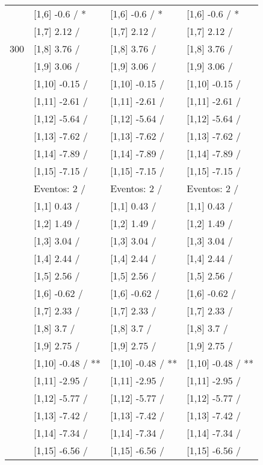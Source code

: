 \begin{table}
\begin{tabular}[t]{llll}
 & {}[1,6] -0.6  / * & {}[1,6] -0.6  / * & {}[1,6] -0.6  / *\\
 & {}[1,7] 2.12  / & {}[1,7] 2.12  / & {}[1,7] 2.12  /\\
300 & {}[1,8] 3.76  / & {}[1,8] 3.76  / & {}[1,8] 3.76  /\\
\addlinespace
 & {}[1,9] 3.06  / & {}[1,9] 3.06  / & {}[1,9] 3.06  /\\
 & {}[1,10] -0.15  / & {}[1,10] -0.15  / & {}[1,10] -0.15  /\\
 & {}[1,11] -2.61  / & {}[1,11] -2.61  / & {}[1,11] -2.61  /\\
 & {}[1,12] -5.64  / & {}[1,12] -5.64  / & {}[1,12] -5.64  /\\
 & {}[1,13] -7.62  / & {}[1,13] -7.62  / & {}[1,13] -7.62  /\\
\addlinespace
 & {}[1,14] -7.89  / & {}[1,14] -7.89  / & {}[1,14] -7.89  /\\
 & {}[1,15] -7.15  / & {}[1,15] -7.15  / & {}[1,15] -7.15  /\\
 & Eventos:  2 / & Eventos:  2 / & Eventos:  2 /\\
 & {}[1,1] 0.43  / & {}[1,1] 0.43  / & {}[1,1] 0.43  /\\
 & {}[1,2] 1.49  / & {}[1,2] 1.49  / & {}[1,2] 1.49  /\\
\addlinespace
 & {}[1,3] 3.04  / & {}[1,3] 3.04  / & {}[1,3] 3.04  /\\
 & {}[1,4] 2.44  / & {}[1,4] 2.44  / & {}[1,4] 2.44  /\\
 & {}[1,5] 2.56  / & {}[1,5] 2.56  / & {}[1,5] 2.56  /\\
 & {}[1,6] -0.62  / & {}[1,6] -0.62  / & {}[1,6] -0.62  /\\
 & {}[1,7] 2.33  / & {}[1,7] 2.33  / & {}[1,7] 2.33  /\\
\addlinespace
500 & {}[1,8] 3.7  / & {}[1,8] 3.7  / & {}[1,8] 3.7  /\\
 & {}[1,9] 2.75  / & {}[1,9] 2.75  / & {}[1,9] 2.75  /\\
 & {}[1,10] -0.48  / ** & {}[1,10] -0.48  / ** & {}[1,10] -0.48  / **\\
 & {}[1,11] -2.95  / & {}[1,11] -2.95  / & {}[1,11] -2.95  /\\
 & {}[1,12] -5.77  / & {}[1,12] -5.77  / & {}[1,12] -5.77  /\\
\addlinespace
 & {}[1,13] -7.42  / & {}[1,13] -7.42  / & {}[1,13] -7.42  /\\
 & {}[1,14] -7.34  / & {}[1,14] -7.34  / & {}[1,14] -7.34  /\\
 & {}[1,15] -6.56  / & {}[1,15] -6.56  / & {}[1,15] -6.56  /\\
\bottomrule
\end{tabular}
\end{table}
